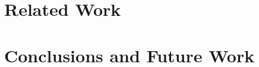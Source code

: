 \documentclass[]{sig-alternate}
\begin{document}
\section{Related Work}
\label{sec:RelatedWork}

\section{Conclusions and Future Work}
\label{sec:FutureWork}

%

\begin{scriptsize}
  
\end{scriptsize}
\end{document}
